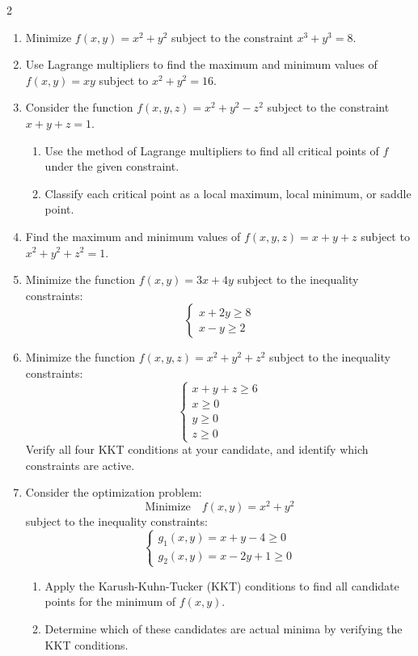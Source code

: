 \begin{multicols}{2}
\begin{enumerate}
    \item Minimize $f(x,y) = x^2 + y^2$ subject to the constraint $x^3 + y^3 = 8$.
    
    \item Use Lagrange multipliers to find the maximum and minimum values of $f(x,y) = xy$ subject to $x^2 + y^2 = 16$.

    \item Consider the function \( f(x,y,z) = x^2 + y^2 - z^2 \) subject to the constraint \( x + y + z = 1 \).
    \begin{enumerate}
        \item Use the method of Lagrange multipliers to find all critical points of \( f \) under the given constraint.
        \item Classify each critical point as a local maximum, local minimum, or saddle point.
    \end{enumerate}
    
    \item Find the maximum and minimum values of $f(x,y,z) = x + y + z$ subject to $x^2 + y^2 + z^2 = 1$.

    \item Minimize the function \( f(x,y) = 3x + 4y \) subject to the inequality constraints:
    \[
    \begin{cases}
    x + 2y \geq 8 \\
    x - y \geq 2
    \end{cases}
    \]
    
    \item Minimize the function \( f(x,y,z) = x^2 + y^2 + z^2 \) subject to the inequality constraints:
    \[
    \begin{cases}
    x + y + z \geq 6 \\
    x \geq 0 \\
    y \geq 0 \\
    z \geq 0
    \end{cases}
    \]
    Verify all four KKT conditions at your candidate, and identify which constraints are active.
    
    \item Consider the optimization problem:
    \[
    \text{Minimize} \quad f(x,y) = x^2 + y^2
    \]
    subject to the inequality constraints:
\[
\begin{cases}
g_1(x,y) = x + y - 4 \geq 0 \\
g_2(x,y) = x - 2y + 1 \geq 0
\end{cases}
\]
    \begin{enumerate}
        \item Apply the Karush-Kuhn-Tucker (KKT) conditions to find all candidate points for the minimum of \( f(x,y) \).
        \item Determine which of these candidates are actual minima by verifying the KKT conditions.
    \end{enumerate}

\end{enumerate}
\end{multicols}

